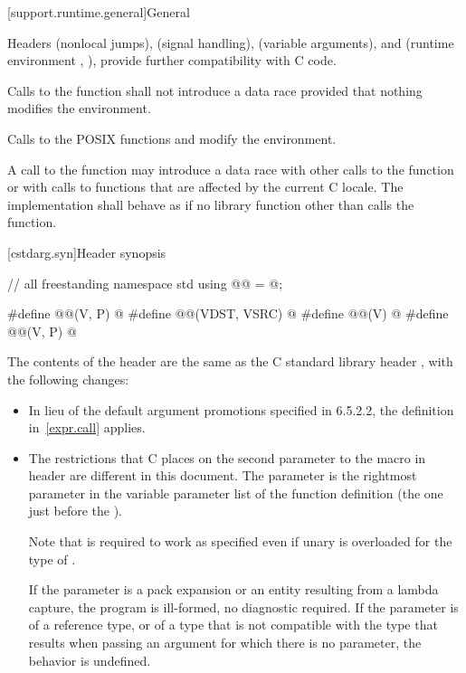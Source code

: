 [support.runtime.general]{General}

\pnum
{}%
%
Headers
 (nonlocal jumps),
 (signal handling),
 (variable arguments),
and
 (runtime environment , ),
provide further compatibility with C code.

\pnum
Calls to the function
%
 shall not introduce a data
race provided that nothing modifies the environment.
\begin{note}
Calls to the POSIX functions
%
 and
%
 modify the
environment.
\end{note}

\pnum
A call to the  function
may introduce a data race with other
calls to the  function or with calls to functions that are
affected by the current C locale. The implementation shall behave as if no
library function other than  calls the 
function.

[cstdarg.syn]{Header  synopsis}

%
\begin{codeblock}
// all freestanding
namespace std {
  using @@ = @\seebelow@;
}

#define @@(V, P) @\seebelow@
#define @@(VDST, VSRC) @\seebelow@
#define @@(V) @\seebelow@
#define @@(V, P) @\seebelow@
\end{codeblock}

\pnum
The contents of the header  are the same as the C
standard library header , with the following changes:
\begin{itemize}
\item
In lieu of the default argument promotions specified in \IsoC{} 6.5.2.2,
the definition in~\ref{expr.call} applies.
\item
The restrictions that C places on the second parameter to the
 macro in header 
are different in this document.
The parameter
is the rightmost parameter in the variable parameter list
of the function definition (the one just before the
).
\begin{footnote}
Note that
is required to work as specified even if unary
is overloaded for the type of
.
\end{footnote}
If the parameter  is a pack expansion or
an entity resulting from a lambda capture,
the program is ill-formed, no diagnostic required.
If the parameter
is of a reference type, or of a type that is not compatible with the
type that results when passing an argument for which there is no
parameter, the behavior is undefined.
\end{itemize}

